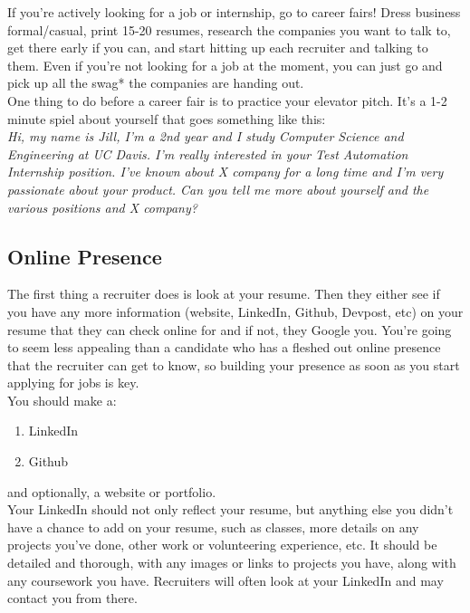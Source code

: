 \documentclass{article}
\begin{document}
If you're actively looking for a job or internship, go to career fairs! Dress business formal/casual, print 15-20 resumes, research the companies you want to talk to, get there early if you can, and start hitting up each recruiter and talking to them. Even if you're not looking for a job at the moment, you can just go and pick up all the swag* the companies are handing out.\\

One thing to do before a career fair is to practice your elevator pitch. It's a 1-2 minute spiel about yourself that goes something like this:\\

\textit{Hi, my name is Jill, I'm a 2nd year and I study Computer Science and Engineering at UC Davis. I'm really interested in your Test Automation Internship position. I've known about X company for a long time and I'm very passionate about your product. Can you tell me more about yourself and the various positions and X company?}
\subsection {Online Presence}
\label{sec:onlinepresence}
\hspace{0.5cm} The first thing a recruiter does is look at your resume. Then they either see if you have any more information (website, LinkedIn, Github, Devpost, etc) on your resume that they can check online for and if not, they Google you. You're going to seem less appealing than a candidate who has a fleshed out online presence that the recruiter can get to know, so building your presence as soon as you start applying for jobs is key. \\

You should make a: 
\begin{enumerate}
    \item LinkedIn
    \item Github
\end{enumerate}

and optionally, a website or portfolio. \\

Your LinkedIn should not only reflect your resume, but anything else you didn't have a chance to add on your resume, such as classes, more details on any projects you've done, other work or volunteering experience, etc. It should be detailed and thorough, with any images or links to projects you have, along with any coursework you have. Recruiters will often look at your LinkedIn and may contact you from there. \\
\end{document}
